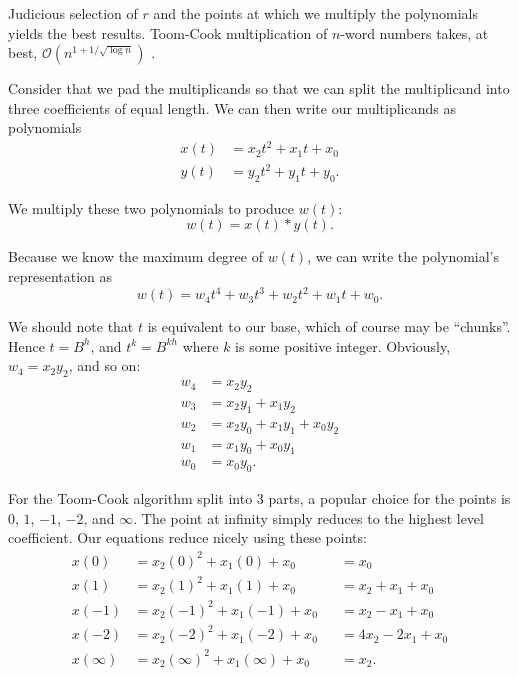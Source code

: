 \documentclass[psamsfonts,reqno]{amsart}
\theoremstyle{definition}
\theoremstyle{remark}
\numberwithin{equation}{section}
\begin{document}
Judicious selection of $r$ and the points at which we multiply the polynomials yields the best results. Toom-Cook multiplication of $n$-word numbers takes, at best, $\mathcal{O}(n^{1+1/\sqrt{\log{n}}})$ \cite{brent2010modern}.

Consider that we pad the multiplicands so that we can split the multiplicand into three coefficients of equal length. We can then write our multiplicands as polynomials
\begin{align*}
	x(t) &= x_2t^2 + x_1t + x_0 \\
	y(t) &= y_2t^2 + y_1t + y_0.
\end{align*}

We multiply these two polynomials to produce $w(t)$:
\begin{equation*}
	w(t)=x(t)*y(t).
\end{equation*}

Because we know the maximum degree of $w(t)$, we can write the polynomial's representation as
\begin{equation*}
	w(t) = w_4t^4 + w_3t^3 + w_2t^2 + w_1t + w_0.
\end{equation*}

We should note that $t$ is equivalent to our base, which of course may be ``chunks''. Hence $t = B^h$, and $t^k = B^{kh}$ where $k$ is some positive integer. Obviously, $w_4 = x_2y_2$, and so on:
\begin{align*}
	w_4 &= x_2y_2 \\
	w_3 &= x_2y_1 + x_1y_2 \\
	w_2 &= x_2y_0 + x_1y_1 + x_0y_2 \\
	w_1 &= x_1y_0 + x_0y_1 \\
	w_0 &= x_0y_0.
\end{align*}

For the Toom-Cook algorithm split into 3 parts, a popular choice for the points is $0$, $1$, $-1$, $-2$, and $\infty$. The point at infinity simply reduces to the highest level coefficient. Our equations reduce nicely using these points:
\begin{align*}
	x(0) &= x_2(0)^2 + x_1(0) + x_0 &&= x_0 \\
	x(1) &= x_2(1)^2 + x_1(1) + x_0	&&= x_2 + x_1 + x_0 \\
	x(-1) &= x_2(-1)^2 + x_1(-1) + x_0 &&= x_2 - x_1 + x_0 \\
	x(-2) &= x_2(-2)^2 + x_1(-2) + x_0 &&= 4x_2 - 2x_1 + x_0 \\
	x(\infty) &= x_2(\infty)^2 + x_1(\infty) + x_0 &&= x_2.
\end{align*}
\end{document}
